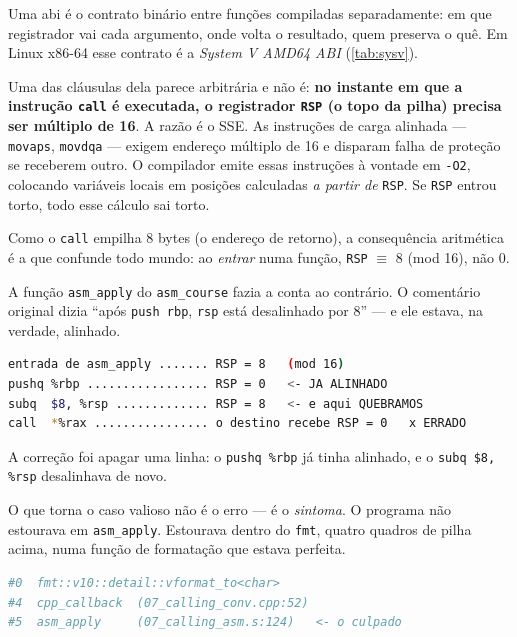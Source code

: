 \begin{porque}
Uma \gls{abi} é o contrato binário entre funções compiladas separadamente:
em que registrador vai cada argumento, onde volta o resultado, quem preserva o
quê. Em Linux x86-64 esse contrato é a \emph{System V AMD64 ABI}
(\cref{tab:sysv}).

Uma das cláusulas dela parece arbitrária e não é: \textbf{no instante em que a
instrução \texttt{call} é executada, o registrador \texttt{RSP} (o topo da
pilha) precisa ser múltiplo de 16}. A razão é o SSE. As instruções de carga
alinhada --- \texttt{movaps}, \texttt{movdqa} --- exigem endereço múltiplo de
16 e disparam falha de proteção se receberem outro. O compilador emite essas
instruções à vontade em \texttt{-O2}, colocando variáveis locais em posições
calculadas \emph{a partir de} \texttt{RSP}. Se \texttt{RSP} entrou torto, todo
esse cálculo sai torto.

Como o \texttt{call} empilha 8 bytes (o endereço de retorno), a consequência
aritmética é a que confunde todo mundo: ao \emph{entrar} numa função,
\texttt{RSP} $\equiv$ 8 (mod 16), não 0.
\end{porque}

A função \texttt{asm\_apply} do \texttt{asm\_course} fazia a conta ao
contrário. O comentário original dizia ``após \texttt{push rbp}, \texttt{rsp}
está desalinhado por 8'' --- e ele estava, na verdade, alinhado.

\begin{lstlisting}[style=bt, language=bash, caption={A aritmética do
    alinhamento, resumo de
    \texttt{src/asm\_course/07\_calling\_asm.s}. Cada linha mostra o resto de
    \texttt{RSP} módulo 16 depois da instrução.}]
entrada de asm_apply ....... RSP = 8   (mod 16)
pushq %rbp ................. RSP = 0   <- JA ALINHADO
subq  $8, %rsp ............. RSP = 8   <- e aqui QUEBRAMOS
call  *%rax ................ o destino recebe RSP = 0   x ERRADO
\end{lstlisting}

A correção foi apagar uma linha: o \texttt{pushq \%rbp} já tinha alinhado, e o
\texttt{subq \$8, \%rsp} desalinhava de novo.

O que torna o caso valioso não é o erro --- é o \emph{sintoma}. O programa não
estourava em \texttt{asm\_apply}. Estourava dentro do \texttt{fmt}, quatro
quadros de pilha acima, numa função de formatação que estava perfeita.

\begin{lstlisting}[style=bt, language=bash, caption={A pilha do \texttt{SIGSEGV},
    como o depurador a mostrava. O culpado é o quadro \texttt{\#5}; o crash
    acontece no \texttt{\#0}.}]
#0  fmt::v10::detail::vformat_to<char>
#4  cpp_callback  (07_calling_conv.cpp:52)
#5  asm_apply     (07_calling_asm.s:124)   <- o culpado
\end{lstlisting}

